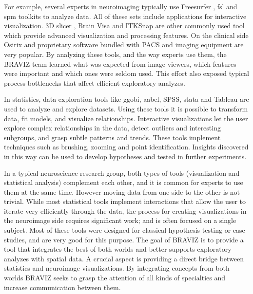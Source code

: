 \documentclass[utf8]{frontiersSCNS} %
\begin{document}
For example, several experts in neuroimaging typically use Freesurfer  \citep{fischl_freesurfer_2012}, fsl\citep{jenkinson_fsl_2012} and spm \citep{friston_statistical_2006} toolkits to analyze data. All of these sets include applications for interactive visualization. 3D slicer \citep{fedorov_3d_2012}, Brain Visa \citep{cointepas_brainvisa:_2001} and ITKSnap \citep{yushkevich_user-guided_2006} are other commonly used tool which provide advanced visualization and processing features. On the clinical side Osirix\citep{rosset_osirix:_2004} and proprietary software bundled with PACS and imaging equipment are very popular. By analyzing these tools, and the way  experts use them, the BRAVIZ team learned what was expected from image viewers, which features were important and which ones were seldom used. This effort also exposed typical process bottlenecks that affect efficient exploratory analyzes.

In statistics, data exploration tools like ggobi\citep{cook_interactive_2007}, aabel, SPSS, stata and Tableau\citep{hanrahan_tableau_2003} are used to analyze and explore datasets. Using these tools it is possible to transform data, fit models, and visualize relationships.  Interactive visualizations let the user explore complex relationships in the data, detect outliers and interesting subgroups, and grasp subtle patterns and trends. These tools implement techniques such as brushing, zooming and point identification. Insights discovered in this way can be used to develop hypotheses and tested in further experiments. 

In a typical neuroscience research group, both types of tools (visualization and statistical analysis) complement each other, and it is common for experts to use them at the same time. However moving data from one side to the other  is not trivial. While most statistical tools implement interactions that allow the user to iterate very efficiently through the data, the process for creating visualizations in the neuroimage side requires significant work; and is often focused on a single subject. Most of these tools were designed for classical hypothesis testing or case studies, and are very good for this purpose. The goal of BRAVIZ is to provide a tool that integrates the best of both worlds and better supports exploratory analyzes with spatial data. A crucial aspect is providing a direct bridge between statistics and neuroimage visualizations. By integrating concepts from both worlds BRAVIZ seeks to grasp the attention of all kinds of specialties and increase communication between them. 
\end{document}
